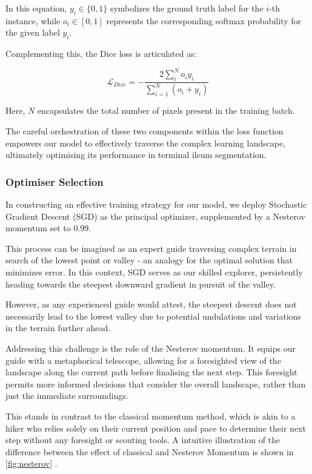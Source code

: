 In this equation, \(y_{i} \in \{ 0, 1 \}\) symbolizes the ground truth label for the \(i\)-th instance, while \(o_{i} \in \left[0, 1\right]\) represents the corresponding softmax probability for the given label \(y_{i}\).

Complementing this, the Dice loss is articulated as:

\[
\mathcal{L}_{Dice} = -\frac{2\sum_{i}^{N}o_{i}y_{i}}{\sum_{i=1}^{N}\left(o_{i} + y_{i}\right)}
\]

Here, \(N\) encapsulates the total number of pixels present in the training batch.

The careful orchestration of these two components within the loss function empowers our model to effectively traverse the complex learning landscape, ultimately optimising its performance in terminal ileum segmentation.

\subsubsection*{Optimiser Selection}

In constructing an effective training strategy for our model, we deploy Stochastic Gradient Descent (SGD) as the principal optimizer, supplemented by a Nesterov momentum set to 0.99.

This process can be imagined as an expert guide traversing complex terrain in search of the lowest point or valley - an analogy for the optimal solution that minimizes error. In this context, SGD serves as our skilled explorer, persistently heading towards the steepest downward gradient in pursuit of the valley.

However, as any experienced guide would attest, the steepest descent does not necessarily lead to the lowest valley due to potential undulations and variations in the terrain further ahead.

Addressing this challenge is the role of the Nesterov momentum. It equips our guide with a metaphorical telescope, allowing for a foresighted view of the landscape along the current path before finalising the next step. This foresight permits more informed decisions that consider the overall landscape, rather than just the immediate surroundings.

This stands in contrast to the classical momentum method, which is akin to a hiker who relies solely on their current position and pace to determine their next step without any foresight or scouting tools. A intuitive illustration of the difference between the effect of classical and Nesterov Momentum is shown in \autoref{fig:nesterov} \cite{lectures16:online}.

